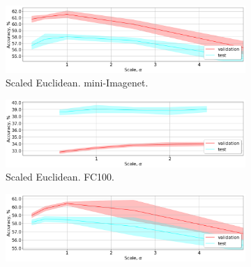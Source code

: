 \documentclass{article}
\begin{document}
\begin{figure}[t]
%
    \centering
    \begin{subfigure}[t]{0.49\textwidth}
        \includegraphics[width=\textwidth]{scale_crossvalidation_polynomial_MIN_1shot.png}
        \caption{Scaled Euclidean. mini-Imagenet.}
        \label{fig:scaled_euclidean_miniimagenet_1shot}
    \end{subfigure}
    \begin{subfigure}[t]{0.49\textwidth}
        \includegraphics[width=\textwidth]{scale_crossvalidation_polynomial_CIFAR100_1shot.png}
        \caption{Scaled Euclidean. FC100.}
        \label{fig:scaled_euclidean_cifar100_1shot}
    \end{subfigure}
    \begin{subfigure}[t]{0.49\textwidth}
        \includegraphics[width=\textwidth]{scale_crossvalidation_cbn_MIN_1shot.png}

\end{subfigure}
\end{figure}
\end{document}
